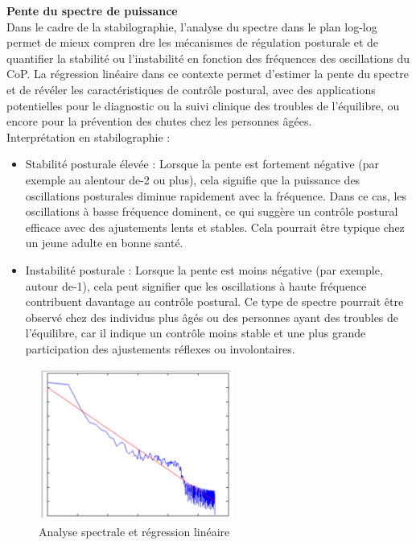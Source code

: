 \textbf{Pente du spectre de puissance}\\

Dans le cadre de la stabilographie, l’analyse du spectre dans le plan log-log permet de mieux compren
dre les mécanismes de régulation posturale et de quantifier la stabilité ou l’instabilité en fonction des
fréquences des oscillations du CoP. La régression linéaire dans ce contexte permet d’estimer la pente du
spectre et de révéler les caractéristiques de contrôle postural, avec des applications potentielles pour le
diagnostic ou la suivi clinique des troubles de l’équilibre, ou encore pour la prévention des chutes chez
les personnes âgées.\\

Interprétation en stabilographie :\\

\begin{itemize}
    \item Stabilité posturale élevée : Lorsque la pente est fortement négative (par exemple au alentour de-2 ou plus), cela signifie que la puissance des oscillations posturales diminue rapidement avec la
    fréquence. Dans ce cas, les oscillations à basse fréquence dominent, ce qui suggère un contrôle
    postural efficace avec des ajustements lents et stables. Cela pourrait être typique chez un jeune
    adulte en bonne santé.

    \item Instabilité posturale : Lorsque la pente est moins négative (par exemple, autour de-1), cela peut
    signifier que les oscillations à haute fréquence contribuent davantage au contrôle postural. Ce type
    de spectre pourrait être observé chez des individus plus âgés ou des personnes ayant des troubles de
    l’équilibre, car il indique un contrôle moins stable et une plus grande participation des ajustements
    réflexes ou involontaires.
\end{itemize}


\begin{figure}[H]
    \centering
    \includegraphics[height=5cm]{images/methode/analyse_spec_regre_lin.png}
    \caption{Analyse spectrale et régression linéaire}\label{fig:regression_lineaire}
\end{figure}

